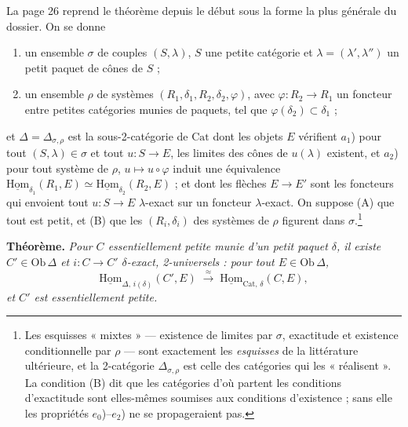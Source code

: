 \documentclass[11pt,a4paper]{article}
\begin{document}
La page 26 reprend le théorème depuis le début sous la forme la plus
générale du dossier. On se donne
\begin{enumerate}
\item[1)] un ensemble $\sigma$ de couples $(S, \lambda)$, $S$ une petite
catégorie et $\lambda = (\lambda', \lambda'')$ un petit paquet de cônes de
$S$ ;
\item[2)] un ensemble $\rho$ de systèmes $(R_{1}, \delta_{1}, R_{2},
\delta_{2}, \varphi)$, avec $\varphi : R_{2} \to R_{1}$ un foncteur entre
petites catégories munies de paquets, tel que $\varphi(\delta_{2}) \subset
\delta_{1}$ ;
\end{enumerate}
et $\Delta = \Delta_{\sigma,\rho}$ est la sous-2-catégorie de $\mathrm{Cat}$
dont les objets $E$ vérifient $a_{1}$) pour tout $(S, \lambda) \in \sigma$
et tout $u : S \to E$, les limites des cônes de $u(\lambda)$ existent, et
$a_{2}$) pour tout système de $\rho$, $u \mapsto u \circ \varphi$ induit une
équivalence $\underline{\mathrm{Hom}}_{\delta_{1}}(R_{1}, E) \simeq
\underline{\mathrm{Hom}}_{\delta_{2}}(R_{2}, E)$ ; et dont les flèches $E \to
E'$ sont les foncteurs qui envoient tout $u : S \to E$ $\lambda$-exact sur
un foncteur $\lambda$-exact. On suppose (A) que tout est petit, et (B) que
les $(R_{i}, \delta_{i})$ des systèmes de $\rho$ figurent dans
$\sigma$.\footnote{Les esquisses « mixtes » — existence de limites par
$\sigma$, exactitude et existence conditionnelle par $\rho$ — sont
exactement les \emph{esquisses} de la littérature ultérieure, et la
2-catégorie $\Delta_{\sigma,\rho}$ est celle des catégories qui les
« réalisent ». La condition (B) dit que les catégories d'où partent les
conditions d'exactitude sont elles-mêmes soumises aux conditions
d'existence ; sans elle les propriétés $e_{0}$)--$e_{2}$) ne se
propageraient pas.}

\textbf{Théorème.} \emph{Pour $C$ essentiellement petite munie d'un petit
paquet $\delta$, il existe $C' \in \mathrm{Ob}\,\Delta$ et $i : C \to C'$
$\delta$-exact, 2-universels : pour tout $E \in \mathrm{Ob}\,\Delta$,}
\[
\underline{\mathrm{Hom}}_{\Delta,\, i(\delta)}(C', E)
\;\xrightarrow{\ \approx\ }\;
\underline{\mathrm{Hom}}_{\mathrm{Cat},\,\delta}(C, E),
\]
\emph{et $C'$ est essentiellement petite.}
\end{document}
